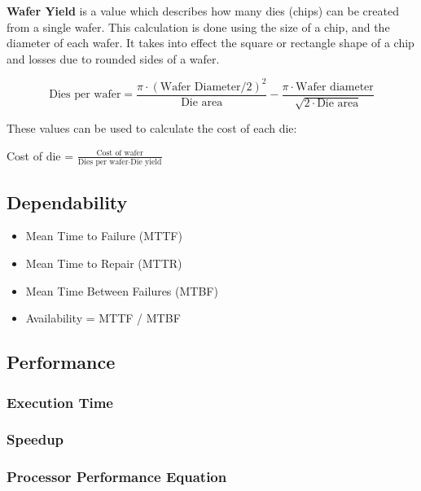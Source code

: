 \documentclass[11pt]{article}
\begin{document}
\textbf{Wafer Yield} is a value which describes how many dies (chips) can be created from a single wafer. This calculation is done using the size of a chip, and the diameter of each wafer. It takes into effect the square or rectangle shape of a chip and losses due to rounded sides of a wafer.

\begin{center}
\begin{equation} \text{Dies per wafer} = 
    \frac{\pi \cdot (\text{Wafer Diameter}/2)^2}{\text{Die area}} - \frac{\pi \cdot \text{Wafer diameter}}{\sqrt{2 \cdot \text{Die area}}}    
\end{equation}
\end{center}

These values can be used to calculate the cost of each die:

\begin{center}
    Cost of die = $\frac{\text{Cost of wafer}}{\text{Dies per wafer}\cdot\text{Die yield}}$
\end{center}

\subsection{Dependability}

\begin{itemize}
    \item Mean Time to Failure (MTTF)
    \item Mean Time to Repair (MTTR)
    \item Mean Time Between Failures (MTBF)
    \item Availability = MTTF / MTBF
\end{itemize}

\subsection{Performance}

\subsubsection{Execution Time}

\subsubsection{Speedup}

\subsubsection{Processor Performance Equation}
\end{document}
